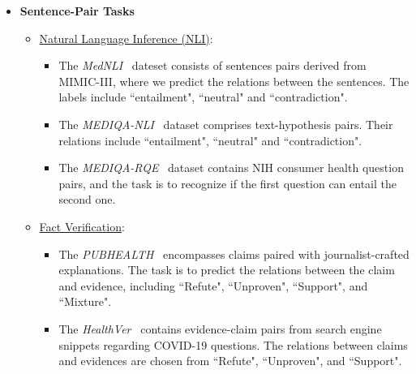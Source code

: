 \documentclass{article} %
\begin{document}
\begin{itemize}[leftmargin=0.3cm]
\item \textbf{Sentence-Pair Tasks}
\begin{itemize}[label=$\circ$]
\item \uline{Natural Language Inference (NLI)}: 

\begin{itemize}
    \item The \textit{MedNLI}~\citep{mednli} dateset consists of sentences pairs derived from MIMIC-III, where we predict the relations between the sentences. The labels include ``entailment", ``neutral" and ``contradiction".
    \item The \textit{MEDIQA-NLI}~\citep{mediqa-nli} dataset  comprises text-hypothesis pairs. Their relations include ``entailment", ``neutral" and ``contradiction".
    \item The \textit{MEDIQA-RQE}~\citep{abacha2016recognizing} dataset contains NIH consumer health question pairs, and the task is to recognize if the first question can entail the second one. 
\end{itemize}

\item \uline{Fact Verification}:
\begin{itemize}
    \item The \textit{PUBHEALTH}~\citep{PUBHEALTH} encompasses claims paired with journalist-crafted explanations. The task is to predict the relations between the claim and evidence, including ``Refute", ``Unproven", ``Support", and ``Mixture".
    \item The \textit{HealthVer}~\citep{healthver} contains evidence-claim pairs from search engine snippets regarding COVID-19 questions. The relations between claims and evidences are chosen from ``Refute", ``Unproven", and ``Support".
\end{itemize}


\end{itemize}
\end{itemize}
\end{document}
